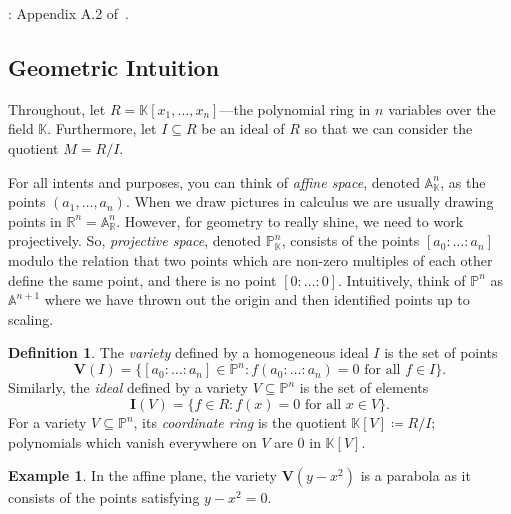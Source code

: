 \documentclass[12pt,a4paper]{article}
\renewcommand{\AA}{\mathbb{A}}
\newcommand{\KK}{\mathbb{K}}
\newcommand{\PP}{\mathbb{P}}
\newcommand{\RR}{\mathbb{R}}
\theoremstyle{definition}
\newtheorem{definition}[theorem]{Definition}
\newtheorem{example}[theorem]{Example}
\numberwithin{equation}{section}
\begin{document}
\vspace*{1cm}

: Appendix A.2 of~\cite{schenck_computational_2003}.

\vspace*{1cm}


\subsection{Geometric Intuition}
Throughout, let $R = \KK[x_1,\dots,x_n]$---the polynomial ring in $n$ variables over the field $\KK$.
Furthermore, let $I \subseteq R$ be an ideal of $R$ so that we can consider the quotient $M = R/I$.

For all intents and purposes, you can think of \emph{affine space}, denoted $\AA_{\KK}^n$, as the points $(a_1,\dots,a_n)$.
When we draw pictures in calculus we are usually drawing points in $\RR^n = \AA_{\RR}^n$.
However, for geometry to really shine, we need to work projectively.
So, \emph{projective space}, denoted $\PP_{\KK}^n$, consists of the points $[a_0 \colon \dots \colon a_n]$ modulo the relation that two points which are non-zero multiples of each other define the same point, and there is no point $[0 \colon \dots \colon 0]$.
Intuitively, think of $\PP^n$ as $\AA^{n+1}$ where we have thrown out the origin and then identified points up to scaling.

\begin{definition}
    The \emph{variety} defined by a homogeneous ideal $I$ is the set of points
    \begin{equation*}
        \mathbf{V}(I) = \{ [a_0 \colon \dots \colon a_n] \in \PP^n \colon f(a_0 \colon \dots \colon a_n) = 0 \text{ for all } f \in I \}.
    \end{equation*}
    Similarly, the \emph{ideal} defined by a variety $V \subseteq \PP^n$ is the set of elements
    \begin{equation*}
        \mathbf{I}(V) = \{ f \in R \colon f(x) = 0 \text{ for all } x \in V \}.
    \end{equation*}
    For a variety $V \subseteq \PP^n$, its \emph{coordinate ring} is the quotient $\KK[V] \coloneqq R/I$;
    polynomials which vanish everywhere on $V$ are $0$ in $\KK[V]$.
\end{definition}

\begin{example}
    In the affine plane, the variety $\mathbf{V}(y - x^2)$ is a parabola as it consists of the points satisfying $y - x^2 = 0$.
\end{example}
\end{document}
